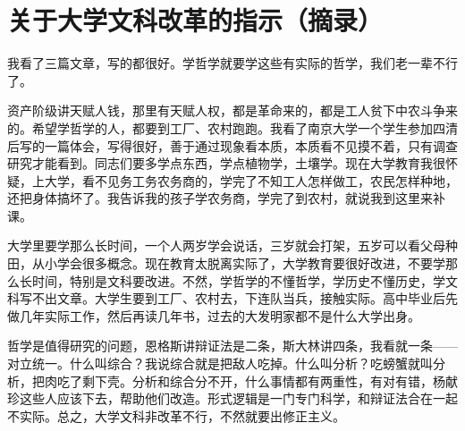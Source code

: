 \section[关于大学文科改革的指示（摘录）（一九六五年十月）]{关于大学文科改革的指示（摘录）}


我看了三篇文章，写的都很好。学哲学就要学这些有实际的哲学，我们老一辈不行了。

资产阶级讲天赋人钱，那里有天赋人权，都是革命来的，都是工人贫下中农斗争来的。希望学哲学的人，都要到工厂、农村跑跑。我看了南京大学一个学生参加四清后写的一篇体会，写得很好，善于通过现象看本质，本质看不见摸不着，只有调查研究才能看到。同志们要多学点东西，学点植物学，土壤学。现在大学教育我很怀疑，上大学，看不见务工务农务商的，学完了不知工人怎样做工，农民怎样种地，还把身体搞坏了。我告诉我的孩子学农务商，学完了到农村，就说我到这里来补课。

大学里要学那么长时间，一个人两岁学会说话，三岁就会打架，五岁可以看父母种田，从小学会很多概念。现在教育太脱离实际了，大学教育要很好改进，不要学那么长时间，特别是文科要改进。不然，学哲学的不懂哲学，学历史不懂历史，学文科写不出文章。大学生要到工厂、农村去，下连队当兵，接触实际。高中毕业后先做几年实际工作，然后再读几年书，过去的大发明家都不是什么大学出身。

哲学是值得研究的问题，恩格斯讲辩证法是二条，斯大林讲四条，我看就一条——对立统一。什么叫综合？我说综合就是把敌人吃掉。什么叫分析？吃螃蟹就叫分析，把肉吃了剩下壳。分析和综合分不开，什么事情都有两重性，有对有错，杨献珍这些人应该下去，帮助他们改造。形式逻辑是一门专门科学，和辩证法合在一起不实际。总之，大学文科非改革不行，不然就要出修正主义。

